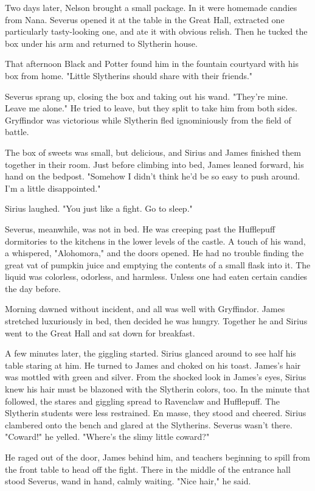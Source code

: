 \documentclass[a4paper,11pt]{article}
\begin{document}
Two days later, Nelson brought a small package. In it were homemade candies from Nana. Severus opened it at the table in the Great Hall, extracted one particularly tasty-looking one, and ate it with obvious relish. Then he tucked the box under his arm and returned to Slytherin house.

That afternoon Black and Potter found him in the fountain courtyard with his box from home. "Little Slytherins should share with their friends."

Severus sprang up, closing the box and taking out his wand. "They're mine. Leave me alone." He tried to leave, but they split to take him from both sides. Gryffindor was victorious while Slytherin fled ignominiously from the field of battle.

The box of sweets was small, but delicious, and Sirius and James finished them together in their room. Just before climbing into bed, James leaned forward, his hand on the bedpost. "Somehow I didn't think he'd be so easy to push around. I'm a little disappointed."

Sirius laughed. "You just like a fight. Go to sleep."

Severus, meanwhile, was not in bed. He was creeping past the Hufflepuff dormitories to the kitchens in the lower levels of the castle. A touch of his wand, a whispered, "Alohomora," and the doors opened. He had no trouble finding the great vat of pumpkin juice and emptying the contents of a small flask into it. The liquid was colorless, odorless, and harmless. Unless one had eaten certain candies the day before.

Morning dawned without incident, and all was well with Gryffindor. James stretched luxuriously in bed, then decided he was hungry. Together he and Sirius went to the Great Hall and sat down for breakfast.

A few minutes later, the giggling started. Sirius glanced around to see half his table staring at him. He turned to James and choked on his toast. James's hair was mottled with green and silver. From the shocked look in James's eyes, Sirius knew his hair must be blazoned with the Slytherin colors, too. In the minute that followed, the stares and giggling spread to Ravenclaw and Hufflepuff. The Slytherin students were less restrained. En masse, they stood and cheered. Sirius clambered onto the bench and glared at the Slytherins. Severus wasn't there. "Coward!" he yelled. "Where's the slimy little coward?"

He raged out of the door, James behind him, and teachers beginning to spill from the front table to head off the fight. There in the middle of the entrance hall stood Severus, wand in hand, calmly waiting. "Nice hair," he said.
\end{document}
